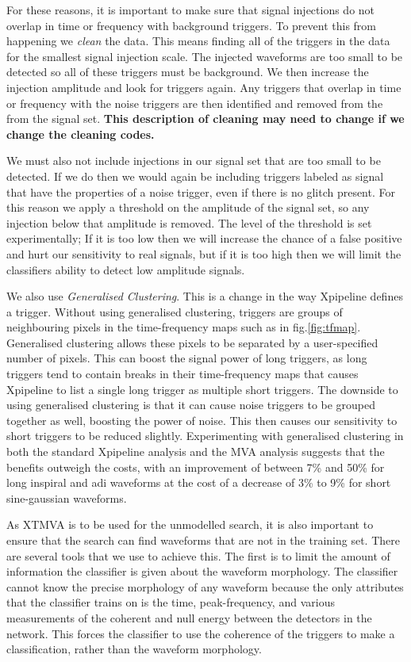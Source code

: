 \documentclass[12pt,twoside,a4paper]{report}
\begin{document}
For these reasons, it is important to make sure that signal injections do not overlap in time or frequency with background triggers. To prevent this from happening we \textit{clean} the data. This means finding all of the triggers in the data for the smallest signal injection scale. The injected waveforms are too small to be detected so all of these triggers must be background. We then increase the injection amplitude and look for triggers again. Any triggers that overlap in time or frequency with the noise triggers are then identified and removed from the from the signal set. \textbf{This description of cleaning may need to change if we change the cleaning codes.}

We must also not include injections in our signal set that are too small to be detected. If we do then we would again be including triggers labeled as signal that have the properties of a noise trigger, even if there is no glitch present. For this reason we apply a threshold on the amplitude of the signal set, so any injection below that amplitude is removed. The level of the threshold is set experimentally; If it is too low then we will increase the chance of a false positive and hurt our sensitivity to real signals, but if it is too high then we will limit the classifiers ability to detect low amplitude signals. 

We also use \textit{Generalised Clustering}. This is a change in the way Xpipeline defines a trigger. Without using generalised clustering, triggers are groups of neighbouring pixels in the time-frequency maps such as in fig.\ref{fig:tfmap}. Generalised clustering allows these pixels to be separated by a user-specified number of pixels. This can boost the signal power of long triggers, as long triggers tend to contain breaks in their time-frequency maps that causes Xpipeline to list a single long trigger as multiple short triggers. The downside to using generalised clustering is that it can cause noise triggers to be grouped together as well, boosting the power of noise. This then causes our sensitivity to short triggers to be reduced slightly. Experimenting with generalised clustering in both the standard Xpipeline analysis and the MVA analysis suggests that the benefits outweigh the costs, with an improvement of between 7\% and 50\% for long inspiral and adi waveforms at the cost of a decrease of 3\% to 9\% for short sine-gaussian waveforms.  

As XTMVA is to be used for the unmodelled search, it is also important to ensure that the search can find waveforms that are not in the training set. There are several tools that we use to achieve this. The first is to limit the amount of information the classifier is given about the waveform morphology. The classifier cannot know the precise morphology of any waveform because the only attributes that the classifier trains on is the time, peak-frequency, and various measurements of the coherent and null energy between the detectors in the network. This forces the classifier to use the coherence of the triggers to make a classification, rather than the waveform morphology. 
\end{document}
